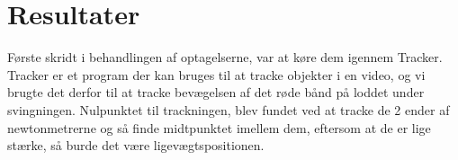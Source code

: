\chapter{Resultater}
Første skridt i behandlingen af optagelserne, var at køre dem igennem Tracker. 
Tracker er et program der kan bruges til at tracke objekter i en video, 
og vi brugte det derfor til at tracke bevægelsen af det røde bånd på loddet under svingningen.
Nulpunktet til trackningen, blev fundet ved at tracke de 2 ender af newtonmetrerne og så finde midtpunktet imellem dem, eftersom at de er lige stærke, så burde det være ligevægtspositionen.